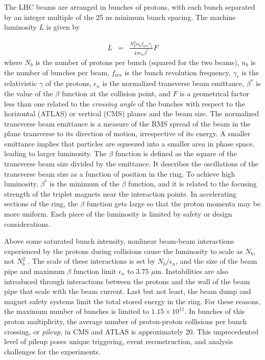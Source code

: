 \documentclass[dissertation.tex]{subfiles}
\begin{document}
The LHC beams are arranged in bunches of protons, with each bunch separated by an integer multiple of the 25 ns minimum bunch spacing.  The machine luminosity $L$ is given by

\begin{eqnarray}
L &=& \frac{N_{b}^{2}n_{b}f_{\mathrm{rev}}\gamma_{r}}{4\pi\epsilon_{n}\beta^{*}}F
\end{eqnarray}
%
where $N_{b}$ is the number of protons per bunch (squared for the two beams), $n_{b}$ is the number of bunches per beam, $f_{\mathrm{rev}}$ is the bunch revolution frequency, $\gamma_{r}$ is the relativistic $\gamma$ of the protons, $\epsilon_{n}$ is the normalized transverse beam emittance, $\beta^{*}$ is the value of the $\beta$ function at the collision point, and $F$ is a geometrical factor less than one related to the \textit{crossing angle} of the bunches with respect to the horizontal (ATLAS) or vertical (CMS) planes and the beam size.  The normalized transverse beam emittance is a measure of the RMS spread of the beam in the plane transverse to its direction of motion, irrespective of its energy.  A smaller emittance implies that particles are squeezed into a smaller area in phase space, leading to larger luminosity.  The $\beta$ function is defined as the square of the transverse beam size divided by the emittance.  It describes the oscillations of the transverse beam size as a function of position in the ring.  To achieve high luminosity, $\beta^{*}$ is the minimum of the $\beta$ function, and it is related to the focusing strength of the triplet magnets near the interaction points.  In accelerating sections of the ring, the $\beta$ function gets large so that the proton momenta may be more uniform.  Each piece of the luminosity is limited by safety or design considerations.

Above some saturated bunch intensity, nonlinear beam-beam interactions experienced by the protons during collisions cause the luminosity to scale as $N_{b}$, not $N_{b}^{2}$ \cite{Sun}.  The scale of these interactions is set by $N_{b}/\epsilon_{n}$, and the size of the beam pipe and maximum $\beta$ function limit $\epsilon_{n}$ to 3.75 $\mu\mbox{m}$.  Instabilities are also introduced through interactions between the protons and the wall of the beam pipe that scale with the beam current.  Last but not least, the beam dump and magnet safety systems limit the total stored energy in the ring.  For these reasons, the maximum number of bunches is limited to $1.15\times10^{11}$.  In bunches of this proton multiplicity, the average number of proton-proton collisions per bunch crossing, or \textit{pileup}, in CMS and ATLAS is approximately 20.  This unprecedented level of pileup poses unique triggering, event reconstruction, and analysis challenges for the experiments.
\end{document}
